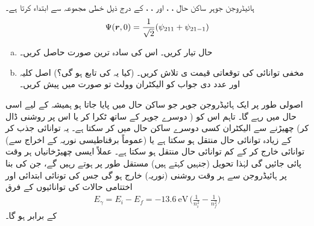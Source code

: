 ہائیڈروجن جوہر ساکن حال ، ،  اور ، ،  کے درج ذیل خطی مجموعہ سے ابتداء کرتا ہے۔
\begin{align*}
\Psi({{\boldsymbol{r}}},0)=\frac{1}{\sqrt{2}}(\psi_{211}+\psi_{21-1})
\end{align*}
\begin{enumerate}[a.]
\item
حال  تیار کریں۔ اس کی سادہ ترین صورت حاصل کریں۔
\item
مخفی توانائی کی توقعاتی قیمت ی  تلاش کریں۔ (کیا یہ  کی تابع ہو گی؟) اصل کلیہ اور عدد دی جواب کو الیکٹران وولٹ تو صورت میں پیش کریں۔
\end{enumerate}

اصولی طور پر ایک ہائیڈروجن جوہر جو ساکن حال  میں پایا جاتا ہو ہمیشہ کے لیے اسی حال میں رہے گا۔ تاہم اس کو ( دوسرے جوہر کے ساتھ ٹکرا کر یا اس پر روشنی ڈال کر) چھیڑنے سے الیکٹران کسی دوسرے ساکن حال میں  کر سکتا ہے۔ یہ توانائی جذب کر کے زیادہ توانائی حال منتقل ہو سکتا ہے یا (عموماً برقناطیسی نوریہ کے اخراج سے) توانائی خارج کر کے کم توانائی حال منتقل ہو سکتا ہے۔ عملاً ایسی چھیڑخانیاں ہر وقت پائی جائیں گی لہٰذا تحویل (جنہیں  کہتے ہیں) مستقل طور پر ہوتے رہیں گے، جن کی بنا پر ہائیڈروجن سے ہر وقت روشنی (نوریہ) خارج ہو گی جس کی تونائی ابتدائی اور اختتامی حالات کی توانائیوں کے فرق
\begin{align}
E_{\gamma}=E_{i}-E_{f}=\SI{-13.6}{\electronvolt}\,\big(\frac{1}{n^{2}_{i}}-\frac{1}{n^{2}_{f}}\big)
\end{align}
 کے برابر ہو گا۔
 
